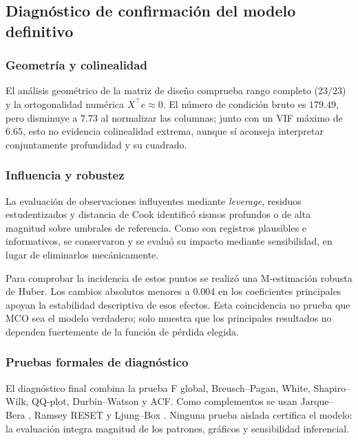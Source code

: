 \documentclass{style}
\begin{document}
\subsection{Diagnóstico de confirmación del modelo definitivo}

\subsubsection{Geometría y colinealidad}


El análisis geométrico de la matriz de diseño comprueba rango completo ($23/23$) y la ortogonalidad numérica $X^{\top}e\approx0$. El número de condición bruto es $179.49$, pero disminuye a $7.73$ al normalizar las columnas; junto con un VIF máximo de $6.65$, esto no evidencia colinealidad extrema, aunque sí aconseja interpretar conjuntamente profundidad y su cuadrado.



\subsubsection{Influencia y robustez}

La evaluación de observaciones influyentes mediante \textit{leverage}, residuos estudentizados y distancia de Cook identificó sismos profundos o de alta magnitud sobre umbrales de referencia. Como son registros plausibles e informativos, se conservaron y se evaluó su impacto mediante sensibilidad, en lugar de eliminarlos mecánicamente.


Para comprobar la incidencia de estos puntos se realizó una M-estimación robusta de Huber. Los cambios absolutos menores a $0.004$ en los coeficientes principales apoyan la estabilidad descriptiva de esos efectos. Esta coincidencia no prueba que MCO sea el modelo verdadero; solo muestra que los principales resultados no dependen fuertemente de la función de pérdida elegida.



\subsubsection{Pruebas formales de diagnóstico}
El diagnóstico final combina la prueba F global, Breusch--Pagan, White, Shapiro--Wilk, QQ-plot, Durbin--Watson y ACF. Como complementos se usan Jarque--Bera \cite{jarquebera1987}, Ramsey RESET \cite{ramsey1969} y Ljung--Box \cite{ljungbox1978}. Ninguna prueba aislada certifica el modelo: la evaluación integra magnitud de los patrones, gráficos y sensibilidad inferencial.
\end{document}
